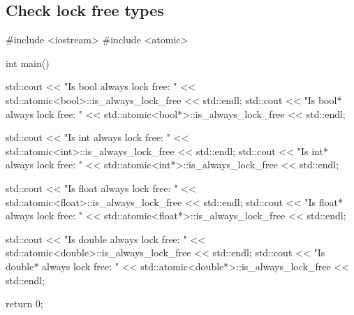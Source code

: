 \documentclass[../main]{subfiles}
\begin{document}
\subsection{Check lock free types}
\begin{Code}
    #include <iostream>
    #include <atomic>

    int main()
    {
        std::cout << "Is bool always lock free: "
                  << std::atomic<bool>::is_always_lock_free
                  << std::endl;
        std::cout << "Is bool* always lock free: "
                  << std::atomic<bool*>::is_always_lock_free
                  << std::endl;

        std::cout << "Is int always lock free: "
                  << std::atomic<int>::is_always_lock_free
                  << std::endl;
        std::cout << "Is int* always lock free: "
                  << std::atomic<int*>::is_always_lock_free
                  << std::endl;

        std::cout << "Is float always lock free: "
                  << std::atomic<float>::is_always_lock_free
                  << std::endl;
        std::cout << "Is float* always lock free: "
                  << std::atomic<float*>::is_always_lock_free
                  << std::endl;

        std::cout << "Is double always lock free: "
                  << std::atomic<double>::is_always_lock_free
                  << std::endl;
        std::cout << "Is double* always lock free: "
                  << std::atomic<double*>::is_always_lock_free
                  << std::endl;

        return 0;
    }
\end{Code}
\end{document}
